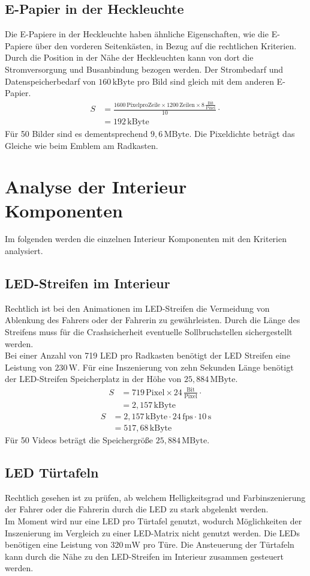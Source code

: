 \subsection{E-Papier in der Heckleuchte}
Die E-Papiere in der Heckleuchte haben ähnliche Eigenschaften, wie die E-Papiere über den vorderen Seitenkästen, in Bezug auf die rechtlichen Kriterien. Durch die Position in der Nähe der Heckleuchten kann von dort die Stromversorgung und Busanbindung bezogen werden. Der Strombedarf und Datenspeicherbedarf von $ 160\,\mathrm{kByte} $ pro Bild sind gleich mit dem anderen E-Papier. 
\begin{align}
	S &= \frac{1600\,\mathrm{Pixel pro Zeile} \times 1200\,\mathrm{Zeilen} \times 8\,\frac{\mathrm{Bit}}{\mathrm{Pixel}}}{10} \cdot \\
	&= 192\,\mathrm{kByte}
\end{align}
Für 50 Bilder sind es dementsprechend $ 9,6\,\mathrm{MByte} $.
Die Pixeldichte beträgt das Gleiche wie beim Emblem am Radkasten.
\section{Analyse der Interieur Komponenten}
Im folgenden werden die einzelnen Interieur Komponenten mit den Kriterien analysiert.
\subsection{LED-Streifen im Interieur}
Rechtlich ist bei den Animationen im LED-Streifen die Vermeidung von Ablenkung des Fahrers oder der Fahrerin zu gewährleisten.
Durch die Länge des Streifens muss für die Crashsicherheit eventuelle Sollbruchstellen sichergestellt werden. \\
Bei einer Anzahl von 719 LED pro Radkasten benötigt der LED Streifen eine Leistung von $ 230\,\mathrm{W} $.
Für eine Inszenierung von zehn Sekunden Länge benötigt der LED-Streifen Speicherplatz in der Höhe von $ 25,884\,\mathrm{MByte}$.
\begin{align}
	S &= 719\,\mathrm{Pixel} \times 24\,\frac{\mathrm{Bit}}{\mathrm{Pixel}} \cdot \\
	&= 2,157\,\mathrm{kByte}
\end{align}
\begin{align}
	S &= 2,157\,\mathrm{kByte} \cdot 24\,\mathrm{fps} \cdot 10\,\mathrm{s}\\
	&= 517,68\,\mathrm{kByte}
\end{align}
Für 50 Videos beträgt die Speichergröße $ 25,884\,\mathrm{MByte} $.
\subsection{LED Türtafeln}
Rechtlich gesehen ist zu prüfen, ab welchem Helligkeitsgrad und Farbinszenierung der Fahrer oder die Fahrerin durch die LED zu stark abgelenkt werden. \\
Im Moment wird nur eine LED pro Türtafel genutzt, wodurch Möglichkeiten der Inszenierung im Vergleich zu einer LED-Matrix nicht genutzt werden. 
Die LEDs benötigen eine Leistung von $ 320\,\mathrm{mW} $ pro Türe.
Die Ansteuerung der Türtafeln kann durch die Nähe zu den LED-Streifen im Interieur zusammen gesteuert werden.
